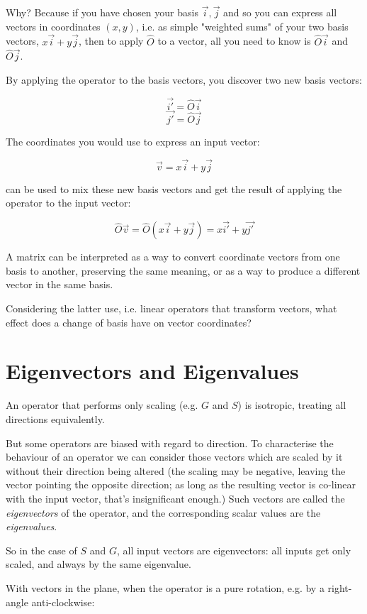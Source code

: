 Why? Because if you have chosen your basis $\vec{i}, \vec{j}$ and so you can express all vectors in coordinates $(x, y)$, i.e. as simple "weighted sums" of your two basis vectors, $x\vec{i} + y\vec{j}$, then to apply $\hat{O}$ to a vector, all you need to know is $\hat{O}\vec{i}$ and $\hat{O}\vec{j}$.

By applying the operator to the basis vectors, you discover two new basis vectors:

$$\vec{i'} = \hat{O}\vec{i}$$
$$\vec{j'} = \hat{O}\vec{j}$$

The coordinates you would use to express an input vector:

$$\vec{v} = x\vec{i} + y\vec{j}$$

can be used to mix these new basis vectors and get the result of applying the operator to the input vector:

$$\hat{O}\vec{v} = \hat{O}(x\vec{i} + y\vec{j}) = x\vec{i'} + y\vec{j'}$$

A matrix can be interpreted as a way to convert coordinate vectors from one basis to another, preserving the same meaning, or as a way to produce a different vector in the same basis.

Considering the latter use, i.e. linear operators that transform vectors, what effect does a change of basis have on vector coordinates?

\section{Eigenvectors and Eigenvalues}\label{sec:vectors-eigen}

An operator that performs only scaling (e.g. $G$ and $S$) is isotropic, treating all directions equivalently.

But some operators are biased with regard to direction. To characterise the behaviour of an operator we can consider those vectors which are scaled by it without their direction being altered (the scaling may be negative, leaving the vector pointing the opposite direction; as long as the resulting vector is co-linear with the input vector, that's insignificant enough.) Such vectors are called the \textit{eigenvectors} of the operator, and the corresponding scalar values are the \textit{eigenvalues}.

So in the case of $S$ and $G$, all input vectors are eigenvectors: all inputs get only scaled, and always by the same eigenvalue.

With vectors in the plane, when the operator is a pure rotation, e.g. by a right-angle anti-clockwise:

